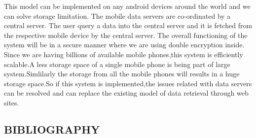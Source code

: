 \documentclass[12pt, a4paper]{article}
\begin{document}
\hspace{5mm}This model can be implemented on any android devices around the world and we can solve storage limitation. The mobile data servers are co-ordinated by a central server. The user query a data into the central server and it is fetched from the respective mobile device by the central server. The overall functioning of the system will be in a secure manner where we are using double encryption inside.
 \\
 
 \hspace{5mm}Since we are having billions of available mobile phones,this system is efficiently scalable.A less storage space of a single mobile phone is being part of large system.Simlilarly the storage from all the mobile phones will results in a huge storage space.So if this system is implemented,the issues related with data servers can be resolved and can replace the existing model of data retrieval through web sites.
\newpage
\begin{center}
\section{BIBLIOGRAPHY}\vspace{5mm}
\end{center}
\justify
\end{document}
